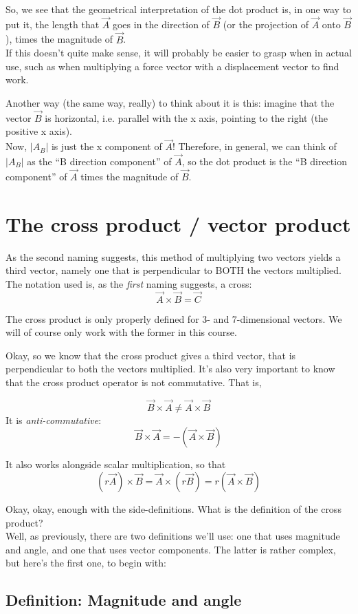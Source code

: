 \documentclass[8.01x]{subfiles}
\begin{document}
So, we see that the geometrical interpretation of the dot product is, in one way to put it, the length that $\vec{A}$ goes in the direction of $\vec{B}$ (or the projection of $\vec{A}$ onto $\vec{B}$), times the magnitude of $\vec{B}$.\\
If this doesn't quite make sense, it will probably be easier to grasp when in actual use, such as when multiplying a force vector with a displacement vector to find work.

Another way (the same way, really) to think about it is this: imagine that the vector $\vec{B}$ is horizontal, i.e. parallel with the x axis, pointing to the right (the positive x axis).\\
Now, $|A_B|$ is just the x component of $\vec{A}$! Therefore, in general, we can think of $|A_B|$ as the ``B direction component'' of $\vec{A}$, so the dot product is the ``B direction component'' of $\vec{A}$ times the magnitude of $\vec{B}$.

\section{The cross product / vector product}
As the second naming suggests, this method of multiplying two vectors yields a third vector, namely one that is perpendicular to BOTH the vectors multiplied.\\
The notation used is, as the \emph{first} naming suggests, a cross:
\[ \vec{A} \times \vec{B} = \vec{C} \]

The cross product is only properly defined for 3- and 7-dimensional vectors. We will of course only work with the former in this course.

Okay, so we know that the cross product gives a third vector, that is perpendicular to both the vectors multiplied. It's also very important to know that the cross product operator is not commutative. That is,

\[ \vec{B} \times \vec{A} \neq \vec{A} \times \vec{B} \]
It is \emph{anti-commutative}:
\[ \vec{B} \times \vec{A} = -(\vec{A} \times \vec{B}) \]

It also works alongside scalar multiplication, so that
\[ (r \vec{A}) \times \vec{B} = \vec{A} \times (r \vec{B}) = r(\vec{A} \times \vec{B}) \]

Okay, okay, enough with the side-definitions. What is the definition of the cross product?\\
Well, as previously, there are two definitions we'll use: one that uses magnitude and angle, and one that uses vector components. The latter is rather complex, but here's the first one, to begin with: \subsection{Definition: Magnitude and angle}
\end{document}
